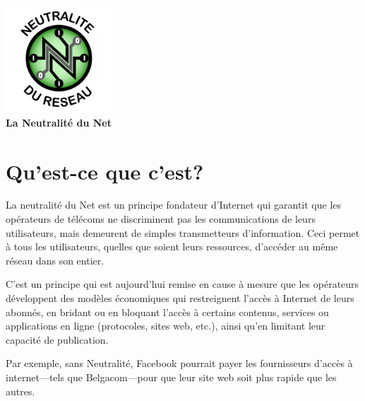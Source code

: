 \documentclass[a4paper,11pt,sf]{leaflet}
\begin{document}
\begin{center}
  \vspace*{\fill}
  \includegraphics[width=4cm]{neutralite-du-reseau} \\[0.75cm]
  
  \LARGE
  \textbf{La Neutralité du Net}
  \\[2cm]
\end{center}

\section{Qu'est-ce que c'est?}\label{kezako}

La neutralité du Net est un principe fondateur d'Internet qui garantit
que les opérateurs de télécoms ne discriminent pas les communications de
leurs utilisateurs, mais demeurent de simples transmetteurs
d'information. Ceci permet à tous les utilisateurs, quelles que
soient leurs ressources, d'accéder au même réseau dans son entier.

C'est un principe qui est aujourd'hui remise en cause à mesure que les
opérateurs développent des modèles économiques qui restreignent l'accès
à Internet de leurs abonnés, en bridant ou en bloquant l'accès à
certains contenus, services ou applications en ligne (protocoles, sites
web, etc.), ainsi qu'en limitant leur capacité de publication.

Par exemple, sans Neutralité, Facebook pourrait payer les fournisseurs d'accès à internet---tels que Belgacom---pour que leur site web soit plus rapide que les autres.

\end{document}
